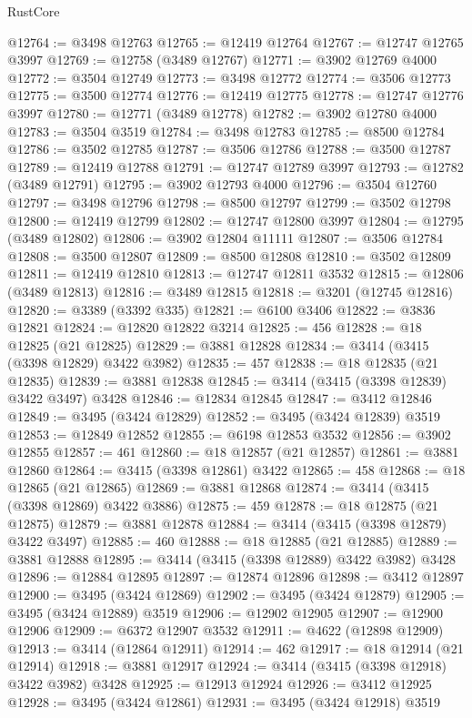 \begin{lexlean}{RustCore}
\begin{coremodule}
@12764 := @3498 @12763
@12765 := @12419 @12764
@12767 := @12747 @12765 @3997
@12769 := @12758 (@3489 @12767)
@12771 := @3902 @12769 @4000
@12772 := @3504 @12749
@12773 := @3498 @12772
@12774 := @3506 @12773
@12775 := @3500 @12774
@12776 := @12419 @12775
@12778 := @12747 @12776 @3997
@12780 := @12771 (@3489 @12778)
@12782 := @3902 @12780 @4000
@12783 := @3504 @3519
@12784 := @3498 @12783
@12785 := @8500 @12784
@12786 := @3502 @12785
@12787 := @3506 @12786
@12788 := @3500 @12787
@12789 := @12419 @12788
@12791 := @12747 @12789 @3997
@12793 := @12782 (@3489 @12791)
@12795 := @3902 @12793 @4000
@12796 := @3504 @12760
@12797 := @3498 @12796
@12798 := @8500 @12797
@12799 := @3502 @12798
@12800 := @12419 @12799
@12802 := @12747 @12800 @3997
@12804 := @12795 (@3489 @12802)
@12806 := @3902 @12804 @11111
@12807 := @3506 @12784
@12808 := @3500 @12807
@12809 := @8500 @12808
@12810 := @3502 @12809
@12811 := @12419 @12810
@12813 := @12747 @12811 @3532
@12815 := @12806 (@3489 @12813)
@12816 := @3489 @12815
@12818 := @3201 (@12745 @12816)
@12820 := @3389 (@3392 @335)
@12821 := @6100 @3406
@12822 := @3836 @12821
@12824 := @12820 @12822 @3214
@12825 := 456
@12828 := @18 @12825 (@21 @12825)
@12829 := @3881 @12828
@12834 := @3414 (@3415 (@3398 @12829) @3422 @3982)
@12835 := 457
@12838 := @18 @12835 (@21 @12835)
@12839 := @3881 @12838
@12845 := @3414 (@3415 (@3398 @12839) @3422 @3497) @3428
@12846 := @12834 @12845
@12847 := @3412 @12846
@12849 := @3495 (@3424 @12829)
@12852 := @3495 (@3424 @12839) @3519
@12853 := @12849 @12852
@12855 := @6198 @12853 @3532
@12856 := @3902 @12855
@12857 := 461
@12860 := @18 @12857 (@21 @12857)
@12861 := @3881 @12860
@12864 := @3415 (@3398 @12861) @3422
@12865 := 458
@12868 := @18 @12865 (@21 @12865)
@12869 := @3881 @12868
@12874 := @3414 (@3415 (@3398 @12869) @3422 @3886)
@12875 := 459
@12878 := @18 @12875 (@21 @12875)
@12879 := @3881 @12878
@12884 := @3414 (@3415 (@3398 @12879) @3422 @3497)
@12885 := 460
@12888 := @18 @12885 (@21 @12885)
@12889 := @3881 @12888
@12895 := @3414 (@3415 (@3398 @12889) @3422 @3982) @3428
@12896 := @12884 @12895
@12897 := @12874 @12896
@12898 := @3412 @12897
@12900 := @3495 (@3424 @12869)
@12902 := @3495 (@3424 @12879)
@12905 := @3495 (@3424 @12889) @3519
@12906 := @12902 @12905
@12907 := @12900 @12906
@12909 := @6372 @12907 @3532
@12911 := @4622 (@12898 @12909)
@12913 := @3414 (@12864 @12911)
@12914 := 462
@12917 := @18 @12914 (@21 @12914)
@12918 := @3881 @12917
@12924 := @3414 (@3415 (@3398 @12918) @3422 @3982) @3428
@12925 := @12913 @12924
@12926 := @3412 @12925
@12928 := @3495 (@3424 @12861)
@12931 := @3495 (@3424 @12918) @3519

\end{coremodule}
\end{lexlean}
